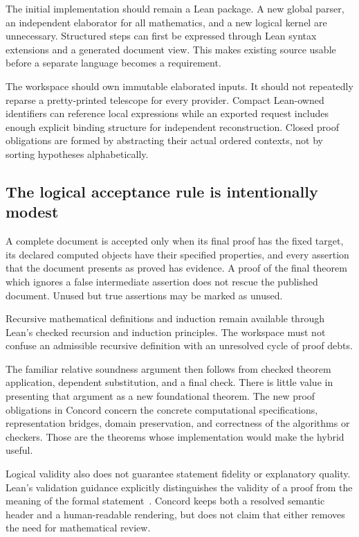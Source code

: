 \documentclass[11pt,a4paper]{article}
\theoremstyle{remark}
\begin{document}
The initial implementation should remain a Lean package. A new global parser,
an independent elaborator for all mathematics, and a new logical kernel are
unnecessary. Structured steps can first be expressed through Lean syntax
extensions and a generated document view. This makes existing source usable
before a separate language becomes a requirement.

The workspace should own immutable elaborated inputs. It should not repeatedly
reparse a pretty-printed telescope for every provider. Compact Lean-owned
identifiers can reference local expressions while an exported request includes
enough explicit binding structure for independent reconstruction. Closed proof
obligations are formed by abstracting their actual ordered contexts, not by
sorting hypotheses alphabetically.

\subsection{The logical acceptance rule is intentionally modest}
A complete document is accepted only when its final proof has the fixed target,
its declared computed objects have their specified properties, and every
assertion that the document presents as proved has evidence. A proof of the final
theorem which ignores a false intermediate assertion does not rescue the
published document. Unused but true assertions may be marked as unused.

Recursive mathematical definitions and induction remain available through
Lean's checked recursion and induction principles. The workspace must not confuse
an admissible recursive definition with an unresolved cycle of proof debts.

The familiar relative soundness argument then follows from checked theorem
application, dependent substitution, and a final check. There is little value
in presenting that argument as a new foundational theorem. The new proof
obligations in Concord concern the concrete computational specifications,
representation bridges, domain preservation, and correctness of the algorithms
or checkers. Those are the theorems whose implementation would make the hybrid
useful.

Logical validity also does not guarantee statement fidelity or explanatory
quality. Lean's validation guidance explicitly distinguishes the validity of a
proof from the meaning of the formal statement~\cite{leanvalidation}. Concord
keeps both a resolved semantic header and a human-readable rendering, but does
not claim that either removes the need for mathematical review.
\end{document}
